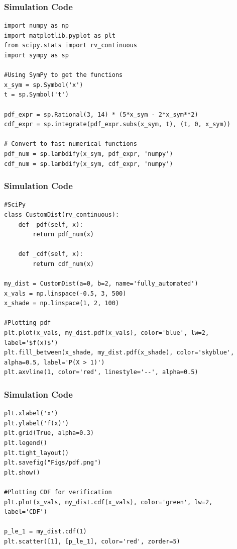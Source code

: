 \documentclass{beamer}
\begin{document}
\begin{frame}[fragile]
\frametitle{Simulation Code}

\begin{lstlisting}
import numpy as np
import matplotlib.pyplot as plt
from scipy.stats import rv_continuous
import sympy as sp

#Using SymPy to get the functions
x_sym = sp.Symbol('x')
t = sp.Symbol('t')

pdf_expr = sp.Rational(3, 14) * (5*x_sym - 2*x_sym**2)
cdf_expr = sp.integrate(pdf_expr.subs(x_sym, t), (t, 0, x_sym))

# Convert to fast numerical functions
pdf_num = sp.lambdify(x_sym, pdf_expr, 'numpy')
cdf_num = sp.lambdify(x_sym, cdf_expr, 'numpy')

\end{lstlisting}

    
\end{frame}

\begin{frame}[fragile]
\frametitle{Simulation Code}

\begin{lstlisting}
#SciPy
class CustomDist(rv_continuous):
    def _pdf(self, x):
        return pdf_num(x)
    
    def _cdf(self, x):
        return cdf_num(x)

my_dist = CustomDist(a=0, b=2, name='fully_automated')
x_vals = np.linspace(-0.5, 3, 500)
x_shade = np.linspace(1, 2, 100)

#Plotting pdf
plt.plot(x_vals, my_dist.pdf(x_vals), color='blue', lw=2, label='$f(x)$')
plt.fill_between(x_shade, my_dist.pdf(x_shade), color='skyblue', alpha=0.5, label='P(X > 1)')
plt.axvline(1, color='red', linestyle='--', alpha=0.5)

\end{lstlisting}

    
\end{frame}

\begin{frame}[fragile]
\frametitle{Simulation Code}

\begin{lstlisting}
plt.xlabel('x')
plt.ylabel('f(x)')
plt.grid(True, alpha=0.3)
plt.legend()
plt.tight_layout()
plt.savefig("Figs/pdf.png")
plt.show()

#Plotting CDF for verification
plt.plot(x_vals, my_dist.cdf(x_vals), color='green', lw=2, label='CDF')

p_le_1 = my_dist.cdf(1)
plt.scatter([1], [p_le_1], color='red', zorder=5)

\end{lstlisting}

    
\end{frame}
\end{document}
